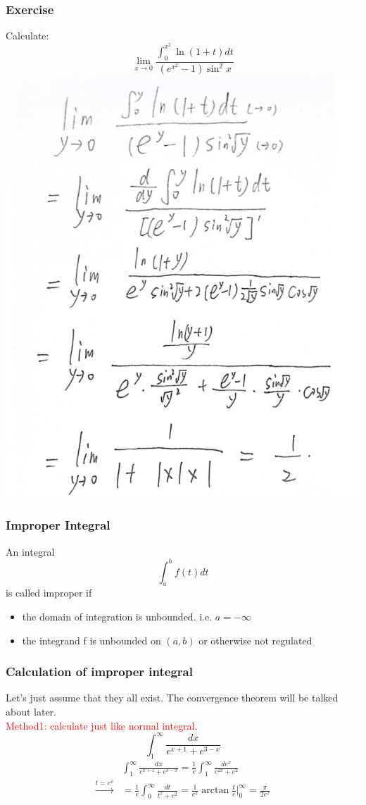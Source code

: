 \documentclass{beamer}
\begin{document}
\begin{frame}
    \frametitle{Exercise}
    Calculate:
    $$\underset{x\to 0}{\lim}\frac{\int_0^{x^2} \ln (1+t)dt}{(e^{x^2}-1)\sin ^2 x}$$
    \pause
    \centering
    \includegraphics[height=0.6\textheight]{solution.png}
\end{frame}
\begin{frame}
    \frametitle{Improper Integral}
    An integral $$\int_a^b f(t)dt$$ is called improper if
    \begin{itemize}
        \item the domain of integration is unbounded. i.e. $a=-\infty$
        \item the integrand f is unbounded on $(a, b)$ or otherwise not regulated
    \end{itemize}

\end{frame}
\begin{frame}
    \frametitle{Calculation of improper integral}

    \hspace{1em}
Let's just assume that they all exist. The convergence theorem
will be talked about later.\\
\vspace{1em}
\textcolor{red}{Method1: calculate just like normal integral.}
$$\int_1^\infty \frac{dx}{e^{x+1}+e^{3-x}}$$
\pause
\begin{align*}
    &\int_1^\infty \frac{dx}{e^{x+1}+e^{3-x}}=\frac{1}{e}\int_1^\infty \frac{d e^x }{e^{2x}+e^2}\\
    \xrightarrow{t=e^x}&=\frac{1}{e}\int_0^\infty \frac{dt}{t^2+e^2}=\frac{1}{e^2} \arctan \frac{t}{e} \bigg|_0^\infty=\frac{\pi}{2e^2}
\end{align*}
\end{frame}
\end{document}
